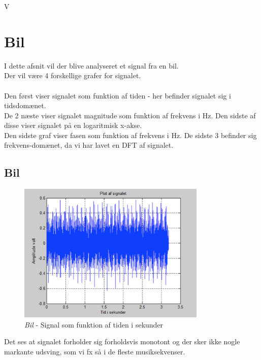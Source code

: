V


\chapter{Bil}
I dette afsnit vil der blive analyseret et signal fra en bil. \\
Der vil være 4 forskellige grafer for signalet.\\ \\
Den først viser signalet som funktion af tiden - her befinder signalet sig i tidsdomænet. \\
De 2 næste viser signalet magnitude som funktion af frekvens i Hz. Den sidste af disse viser signalet på en logaritmisk x-akse. \\
Den sidste graf viser fasen som funktion af frekvens i Hz. De sidste 3 befinder sig frekvens-domænet, da vi har lavet en DFT af signalet.


\section{Bil}

\begin{figure}[H]
	\centering
	\includegraphics[width=0.8\textwidth]{Figurer/Bil}
	\caption{\textit{Bil} - Signal som funktion af tiden i sekunder}
\end{figure}

Det ses at signalet forholder sig forholdsvis monotont og der sker ikke nogle markante udsving, som vi fx så i de fleste musiksekvenser. 

